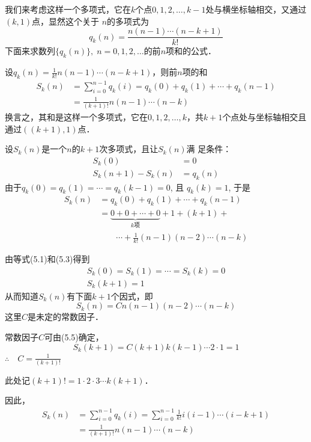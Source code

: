 我们来考虑这样一个多项式，它在$k$个点$0,1,2,\ldots,
k-1$处与横坐标轴相交，又通过$(k,1)$点，显然这个关于
$n$的多项式为
\[q_k(n)=\frac{n(n-1)\cdots(n-k+1)}{k!}\]
下面来求数列$\{q_k(n)\},\; n=0,1,2,\ldots$的前$n$项和的公式．

\begin{example}
设$q_k(n)=\frac{1}{k!}n(n-1)\cdots(n-k+1)$，则前$n$项的和
\[\begin{split}
    S_k(n)&=\sum^{n-1}_{i=0} q_k(i)=q_k(0)+q_k(1)+\cdots+q_k(n-1)\\
    &=\frac{1}{(k+1)!}n(n-1)\cdots(n-k)
\end{split}\]
换言之，其和是这样一个多项式，它在$0,1,2,\ldots,k$，共$k+1$个点处与坐标轴相交且通过$((k+1),1)$点．
\end{example}

\begin{solution}
设$S_k(n)$是一个$n$的$k+1$次多项式，且让$S_k(n)$满
足条件：
\begin{align}
    S_k(0)&=0\\
    S_k(n+1)-S_k(n)&=q_k(n)
\end{align}
由于$q_k(0)=q_k(1)=\cdots=q_k(k-1)=0$, 且
$q_k(k)=1$, 于是
\begin{equation}
    \begin{split}
 S_k(n)&=q_k(0)+q_k(1)+\cdots+q_k(n-1)\\
&=\underbrace{0+0+\cdots+0}_{\text{$k$项}}+1+(k+1)+\\
&\qquad \cdots+
\frac{1}{k!}(n-1)(n-2)\cdots(n-k)     
    \end{split}
\end{equation}

由等式(5.1)和(5.3)得到
\begin{align}
S_k(0)=S_k(1)=\cdots=S_k(k)=0\\
S_k(k+1)=1
\end{align}
从而知道$S_k(n)$有下面$k+1$个因式，即
\[S_k(n)=Cn(n-1)(n-2)\cdots(n-k)\]
这里$C$是未定的常数因子．

常数因子$C$可由(5.5)确定，
\[S_k(k+1)=C(k+1)k(k-1)\cdots2\cdot 1=1\]
$\therefore\quad C=\frac{1}{(k+1)!}$

此处记$(k+1)!=1\cdot 2\cdot 3\cdots k(k+1)$．

因此，
\[\begin{split}
    S_k(n)&=\sum^{n-1}_{i=0} q_k(i)=\sum^{n-1}_{i=0} \frac{1}{k!}i(i-1)\cdots (i-k+1)\\
    &=\frac{1}{(k+1)!}n(n-1)\cdots (n-k)
\end{split}\]
\end{solution}


